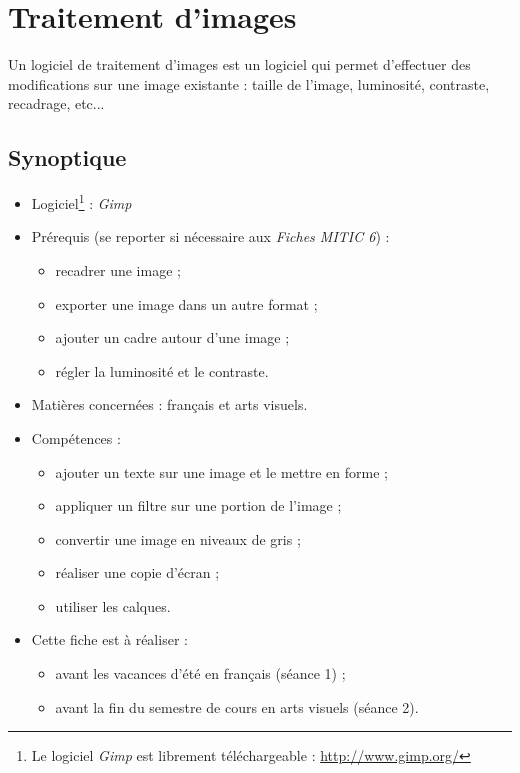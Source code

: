 \chapter{Traitement d'images}  

Un logiciel de traitement d'images est un logiciel qui permet d'effectuer des modifications sur une image existante : taille de l'image, luminosité, contraste, recadrage, etc...

\section*{Synoptique}

{\footnotesize
\begin{itemize}
\item Logiciel\footnote{Le logiciel \emph{Gimp} est librement téléchargeable : \url{http://www.gimp.org/}} : \emph{Gimp}
\item Prérequis (se reporter si nécessaire aux \emph{Fiches MITIC 6}) :
        \begin{itemize}
        \item recadrer une image ;
        \item exporter une image dans un autre format ;
        \item ajouter un cadre autour d'une image ;
        \item régler la luminosité et le contraste.
        \end{itemize}
\item Matières concernées : français et arts visuels.
\item Compétences : 
        \begin{itemize}
        \item ajouter un texte sur une image et le mettre en forme ;
        \item appliquer un filtre sur une portion de l'image ;
        \item convertir une image en niveaux de gris ;
        \item réaliser une copie d'écran ;
        \item utiliser les calques.
        \end{itemize}
\item Cette fiche est à réaliser :
        \begin{itemize}
        \item avant les vacances d'été en français (séance 1) ;
        \item avant la fin du semestre de cours en arts visuels (séance 2).
        \end{itemize}
\end{itemize}
} %

